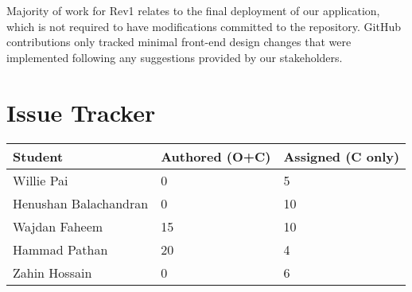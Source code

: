 \documentclass{article}
\begin{document}

Majority of work for Rev1 relates to the final deployment of our application, which is not required to have modifications committed to the repository. GitHub contributions only tracked minimal front-end design changes that were implemented following any suggestions provided by our stakeholders.

\section{Issue Tracker}


\begin{table}[H]
\centering
\begin{tabular}{lll}
\toprule
\textbf{Student} & \textbf{Authored (O+C)} & \textbf{Assigned (C only)}\\
\midrule
Willie Pai & 0 & 5 \\
Henushan Balachandran & 0 & 10 \\
Wajdan Faheem & 15 & 10 \\
Hammad Pathan & 20 & 4 \\
Zahin Hossain & 0 & 6 \\
\bottomrule
\end{tabular}
\end{table}







\end{document}
